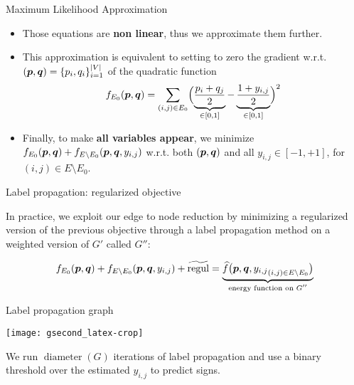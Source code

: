 \documentclass[10pt,svgnames,ignorenonframetext,final]{beamer}
\providecommand{\largelist}{%
  \setlength{\itemsep}{8pt}\setlength{\parskip}{3pt}}
\begin{document}
\begin{frame}{Maximum Likelihood Approximation}

  \begin{itemize}[<+->]
    \largelist
  \item
    Those equations are \textbf{non linear}, thus we
approximate them further.

  \item
This approximation is equivalent to setting to zero the gradient
w.r.t.~\((\boldsymbol{p},\boldsymbol{q}) =\{p_i, q_i\}_{i=1}^{|V|}\) of the quadratic function
\[f_{E_0}(\boldsymbol{p},\boldsymbol{q}) = \sum_{(i,j) \in E_0} \Bigl(\underbrace{\frac{p_i+q_j}{2}}_{\in [0,1]} -
\underbrace{\frac{1+y_{i,j}}{2}}_{\in [0,1]} \Bigr)^2\]

  \item Finally, to make \textbf{all variables appear}, we minimize \alert{\(f_{E_0}(\boldsymbol{p},\boldsymbol{q}) + f_{E\setminus
    E_0}(\boldsymbol{p},\boldsymbol{q}, {y_{i,j}})\)} w.r.t. both \((\boldsymbol{p},\boldsymbol{q})\) and all \(y_{i,j} \in [-1,+1]\), for \((i,j)\in
E\setminus E_0\).

\end{itemize}

\end{frame}

\begin{frame}{Label propagation: regularized objective}

In practice, we exploit our edge to node reduction by \alert{minimizing a
regularized version} of the previous objective through a \alert{label
propagation method on a weighted version of \(G'\)} called \(G''\):

\begin{equation*}
  f_{E_0}(\boldsymbol{p},\boldsymbol{q}) + f_{E\setminus E_0}(\boldsymbol{p},\boldsymbol{q}, {y_{i,j}}) + \widetilde{\mathrm{regul}} = 
  \underbrace{ \widehat{f}\big(\boldsymbol{p},\boldsymbol{q},{y_{i,j}}_{(i,j) \in E\setminus E_0}\big)}_{\text{energy
  function on $G''$}}
\end{equation*}

\end{frame}

\begin{frame}{Label propagation graph}
  \begin{center}
  \vspace{-4mm}
    \texttt{[image: gsecond\_latex-crop]}
  \vspace{-4mm}
  \end{center}
  We run $\operatorname{diameter}(G)$ iterations of label propagation and use a binary threshold over the estimated $y_{i,j}$ to predict signs.
\end{frame}
\end{document}
